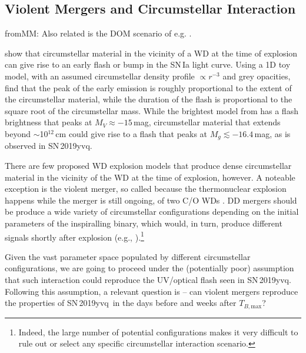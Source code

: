 \documentclass[twocolumn]{aastex63}
\newcommand{\frommark}[1]{{\color{orange} fromMM: {#1}}}
\newcommand{\tbmax}{$T_{B,\mathrm{max}}$}
\newcommand{\sn}{SN\,2019yvq}
\begin{document}
\subsection{Violent Mergers and Circumstellar
Interaction}\label{sec:merger_csm}

\frommark{Also related is the DOM scenario of e.g. \citep{Levanon19}.}

\citet{Piro16} show that circumstellar material in the vicinity of a WD at the
time of explosion can give rise to an early flash or bump in the SN\,Ia light
curve. Using a 1D toy model, with an assumed circumstellar density profile
$\propto r^{-3}$ and grey opacities, \citet{Piro16} find that the peak of the
early emission is roughly proportional to the extent of the circumstellar
material, while the duration of the flash is proportional to the square root
of the circumstellar mass. While the brightest model from \citet{Piro16} has a
flash brightness that peaks at $M_V \approx -15$\,mag, circumstellar material
that extends beyond $\sim$10$^{12}$\,cm could give rise to a flash that peaks
at $M_g \lesssim -16.4$\,mag, as is observed in \sn.

There are few proposed WD explosion models that produce dense circumstellar
material in the vicinity of the WD at the time of explosion, however. A
noteable exception is the violent merger, so called because the thermonuclear
explosion happens while the merger is still ongoing, of two C/O WDs
\citep{Pakmor10,Pakmor11,Pakmor12}. DD mergers should be produce a wide
variety of circumstellar configurations depending on the initial parameters of
the inspiralling binary, which would, in turn, produce different signals
shortly after explosion (e.g., \citealt{Raskin13}).\footnote{Indeed, the large
number of potential configurations makes it very difficult to rule out or
select any specific circumstellar interaction scenario.}

Given the vast parameter space populated by different circumstellar
configurations, we are going to proceed under the (potentially poor)
assumption that such interaction could reproduce the UV/optical flash seen in
\sn. Following this assumption, a relevant question is -- can violent mergers
reproduce the properties of \sn\ in the days before and weeks after \tbmax?
\end{document}
